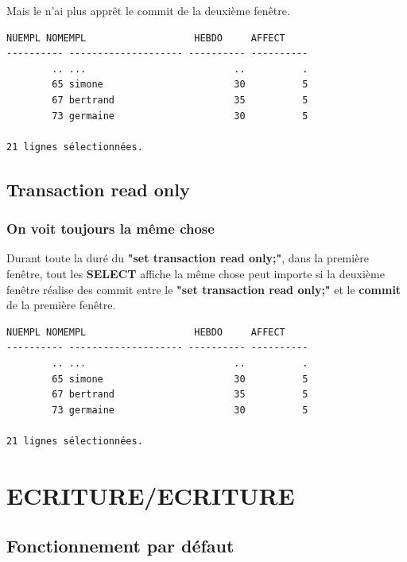 \documentclass{article}
\begin{document}
Mais le n'ai plus apprêt le commit de la deuxième fenêtre.
\begin{lstlisting}[caption= Dernier select * from employe;]
    NUEMPL NOMEMPL                   HEBDO     AFFECT
---------- -------------------- ---------- ----------
        .. ...                          ..          .
        65 simone                       30          5
        67 bertrand                     35          5
        73 germaine                     30          5

21 lignes sélectionnées. 
\end{lstlisting}


\subsection{Transaction read only}
\subsubsection{On voit toujours la même chose}

Durant toute la duré du \textbf{"set transaction read only;"}, dans la première fenêtre, tout les \textbf{SELECT} affiche la même chose peut importe si la deuxième fenêtre réalise des commit entre le \textbf{"set transaction read only;"} et le \textbf{commit} de la première fenêtre.

\begin{lstlisting}[caption= select * from employe;]
    NUEMPL NOMEMPL                   HEBDO     AFFECT
---------- -------------------- ---------- ----------
        .. ...                          ..          .
        65 simone                       30          5
        67 bertrand                     35          5
        73 germaine                     30          5

21 lignes sélectionnées. 
\end{lstlisting}

\section{ECRITURE/ECRITURE}
\subsection{Fonctionnement par défaut}
\end{document}
